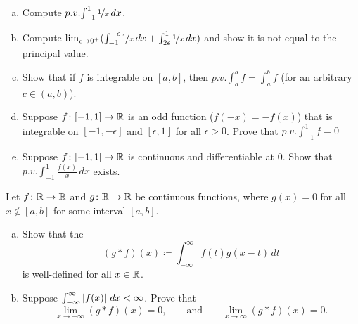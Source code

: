 \begin{exercise}
\leavevmode
\begin{enumerate}[a)]
\item
Compute $p.v.\!\int_{-1}^1 \nicefrac{1}{x}\,dx$.
\item
Compute
$\lim_{\epsilon\to 0^+}
( \int_{-1}^{-\epsilon} \nicefrac{1}{x}\,dx + 
\int_{2\epsilon}^1 \nicefrac{1}{x}\,dx )$ and show it is not equal
to the principal value.
\item
Show that if $f$ is integrable on $[a,b]$, then
$p.v.\!\int_a^b f = \int_a^b f$ (for an arbitrary $c \in (a,b)$).
\item
Suppose $f \colon [-1,1] \to {\mathbb{R}}$
is an odd function ($f(-x)=-f(x)$) that is integrable on
$[-1,-\epsilon]$ and $[\epsilon,1]$ for all $\epsilon >0$.
Prove that 
$p.v.\!\int_{-1}^1 f = 0$
\item
Suppose 
$f \colon [-1,1] \to {\mathbb{R}}$ is continuous and differentiable at 0.  Show that
$p.v.\!\int_{-1}^1 \frac{f(x)}{x}\,dx$ exists.
\end{enumerate}
\end{exercise}

\begin{samepage}
\begin{exercise}
Let $f \colon {\mathbb{R}} \to {\mathbb{R}}$ and 
$g \colon {\mathbb{R}} \to {\mathbb{R}}$ be continuous functions, where
$g(x) = 0$ for all $x \notin [a,b]$ for some interval $[a,b]$.
\begin{enumerate}[a)]
\item
Show that the
\emph{}
\begin{equation*}
(g * f)(x) \coloneqq \int_{-\infty}^\infty f(t)g(x-t)\,dt 
\end{equation*}
is well-defined for all $x \in {\mathbb{R}}$.
\item
Suppose $\int_{-\infty}^\infty \left\lvert {f(x)} \right\rvert\,dx < \infty$.  Prove that
\begin{equation*}
\lim_{x \to -\infty} (g * f)(x) = 0, \qquad \text{and} \qquad
\lim_{x \to \infty} (g * f)(x) = 0 .
\end{equation*}
\end{enumerate}
\end{exercise}
\end{samepage}
